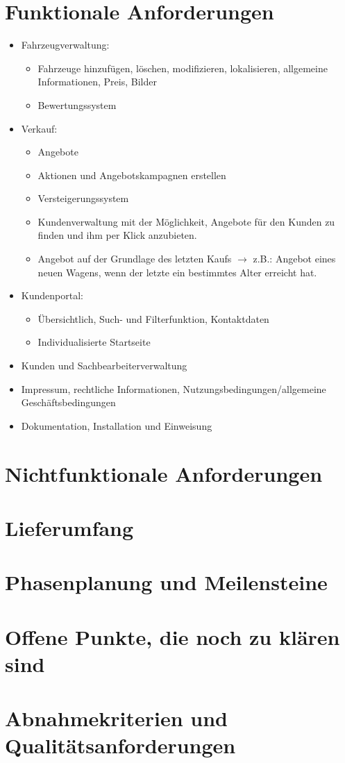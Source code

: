 \documentclass[12pt,a4paper]{scrartcl}
\begin{document}
\section*{Funktionale Anforderungen}
\begin{itemize}
\item Fahrzeugverwaltung:
	\begin{itemize}
	\item Fahrzeuge hinzufügen, löschen, modifizieren, lokalisieren, allgemeine Informationen, Preis, Bilder
	\item Bewertungssystem
	\end{itemize}
\item Verkauf: 
	\begin{itemize}
	\item Angebote
	\item Aktionen und Angebotskampagnen  erstellen
	\item Versteigerungssystem
	\item Kundenverwaltung mit der Möglichkeit, Angebote für den Kunden zu finden und ihm per Klick anzubieten.
	\item Angebot auf der Grundlage des letzten Kaufs $\rightarrow$ z.B.: Angebot eines neuen Wagens, wenn der letzte ein bestimmtes Alter erreicht hat.
	\end{itemize}
\item Kundenportal: 
	\begin{itemize}
	\item Übersichtlich, Such- und Filterfunktion, Kontaktdaten
	\item Individualisierte Startseite
	
	\end{itemize}
\item Kunden und Sachbearbeiterverwaltung
\item Impressum, rechtliche Informationen, Nutzungsbedingungen/allgemeine Geschäftsbedingungen
\item Dokumentation, Installation und Einweisung

\end{itemize}

\section*{Nichtfunktionale Anforderungen}

\section*{Lieferumfang}

\section*{Phasenplanung und Meilensteine}

\section*{Offene Punkte, die noch zu klären sind}

\section*{Abnahmekriterien und Qualitätsanforderungen}
\end{document}
